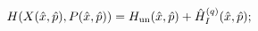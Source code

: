 \begin{equation}
\label{Eq:hat-H}
H(X(\hat x,\hat p),P(\hat x,\hat p))=H_{\rm un}(\hat x,\hat p)+
\hat H^{(q)}_I (\hat x,\hat p);
\end{equation}

